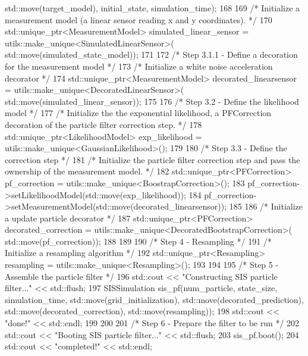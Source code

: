 \begin{DoxyCodeInclude}
      std::move(target\_model), initial\_state, simulation\_time);
168 
169     \textcolor{comment}{/* Initialize a measurement model (a linear sensor reading x and y coordinates). */}
170     std::unique\_ptr<MeasurementModel> simulated\_linear\_sensor = utils::make\_unique<SimulatedLinearSensor>(
      std::move(simulated\_state\_model));
171 
172     \textcolor{comment}{/* Step 3.1.1 - Define a decoration for the measurement model */}
173     \textcolor{comment}{/* Initialize a white noise acceleration decorator */}
174     std::unique\_ptr<MeasurementModel> decorated\_linearsensor = utils::make\_unique<DecoratedLinearSensor>(
      std::move(simulated\_linear\_sensor));
175 
176     \textcolor{comment}{/* Step 3.2 - Define the likelihood model */}
177     \textcolor{comment}{/* Initialize the the exponential likelihood, a PFCorrection decoration of the particle filter
       correction step. */}
178     std::unique\_ptr<LikelihoodModel> exp\_likelihood = utils::make\_unique<GaussianLikelihood>();
179 
180     \textcolor{comment}{/* Step 3.3 - Define the correction step */}
181     \textcolor{comment}{/* Initialize the particle filter correction step and pass the ownership of the measurement model. */}
182     std::unique\_ptr<PFCorrection> pf\_correction = utils::make\_unique<BoostrapCorrection>();
183     pf\_correction->setLikelihoodModel(std::move(exp\_likelihood));
184     pf\_correction->setMeasurementModel(std::move(decorated\_linearsensor));
185 
186     \textcolor{comment}{/* Initialize a update particle decorator */}
187     std::unique\_ptr<PFCorrection> decorated\_correction = utils::make\_unique<DecoratedBootstrapCorrection>(
      std::move(pf\_correction));
188 
189 
190     \textcolor{comment}{/* Step 4 - Resampling */}
191     \textcolor{comment}{/* Initialize a resampling algorithm */}
192     std::unique\_ptr<Resampling> resampling = utils::make\_unique<Resampling>();
193 
194 
195     \textcolor{comment}{/* Step 5 - Assemble the particle filter */}
196     std::cout << \textcolor{stringliteral}{"Constructing SIS particle filter..."} << std::flush;
197     SISSimulation sis\_pf(num\_particle, state\_size, simulation\_time, std::move(grid\_initialization), 
      std::move(decorated\_prediction), std::move(decorated\_correction), std::move(resampling));
198     std::cout << \textcolor{stringliteral}{"done!"} << std::endl;
199 
200 
201     \textcolor{comment}{/* Step 6 - Prepare the filter to be run */}
202     std::cout << \textcolor{stringliteral}{"Booting SIS particle filter..."} << std::flush;
203     sis\_pf.boot();
204     std::cout << \textcolor{stringliteral}{"completed!"} << std::endl;

\end{DoxyCodeInclude}
